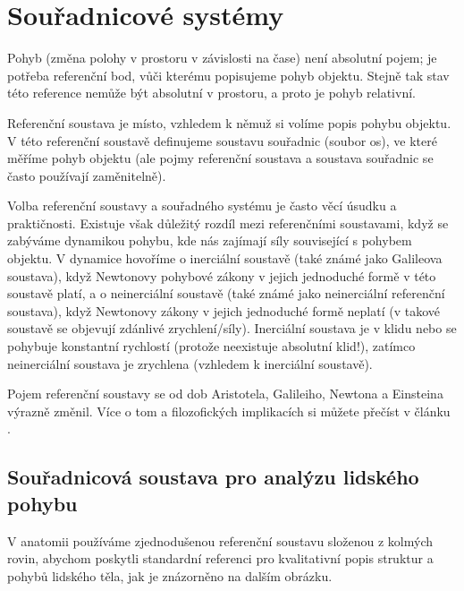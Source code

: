 \documentclass[letterpaper,10pt,english]{jupyterBook}
\begin{document}
\sphinxstepscope


\section{Souřadnicové systémy}
\label{\detokenize{Prednasky/0_3_Sou_u0159adnicov_xe9_syst_xe9my:souradnicove-systemy}}\label{\detokenize{Prednasky/0_3_Sou_u0159adnicov_xe9_syst_xe9my::doc}}
\sphinxAtStartPar
Pohyb (změna polohy v prostoru v závislosti na čase) není absolutní pojem; je potřeba referenční bod, vůči kterému popisujeme pohyb objektu. Stejně tak stav této reference nemůže být absolutní v prostoru, a proto je pohyb relativní.

\sphinxAtStartPar
Referenční soustava je místo, vzhledem k němuž si volíme popis pohybu objektu. V této referenční soustavě definujeme soustavu souřadnic (soubor os), ve které měříme pohyb objektu (ale pojmy referenční soustava a soustava souřadnic se často používají zaměnitelně).

\sphinxAtStartPar
Volba referenční soustavy a souřadného systému je často věcí úsudku a praktičnosti. Existuje však důležitý rozdíl mezi referenčními soustavami, když se zabýváme dynamikou pohybu, kde nás zajímají síly související s pohybem objektu. V dynamice hovoříme o inerciální soustavě (také známé jako Galileova soustava), když Newtonovy pohybové zákony v jejich jednoduché formě v této soustavě platí, a o neinerciální soustavě (také známé jako neinerciální referenční soustava), když Newtonovy zákony v jejich jednoduché formě neplatí (v takové soustavě se objevují zdánlivé zrychlení/síly). Inerciální soustava je v klidu nebo se pohybuje konstantní rychlostí (protože neexistuje absolutní klid!), zatímco neinerciální soustava je zrychlena (vzhledem k inerciální soustavě).

\sphinxAtStartPar
Pojem referenční soustavy se od dob Aristotela, Galileiho, Newtona a Einsteina výrazně změnil. Více o tom a filozofických implikacích si můžete přečíst v článku .


\subsection{Souřadnicová soustava pro analýzu lidského pohybu}
\label{\detokenize{Prednasky/0_3_Sou_u0159adnicov_xe9_syst_xe9my:souradnicova-soustava-pro-analyzu-lidskeho-pohybu}}
\sphinxAtStartPar
V anatomii používáme zjednodušenou referenční soustavu složenou z kolmých rovin, abychom poskytli standardní referenci pro kvalitativní popis struktur a pohybů lidského těla, jak je znázorněno na dalším obrázku.
\end{document}
